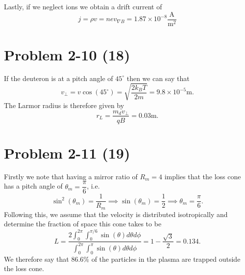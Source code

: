Lastly, if we neglect ions we obtain a drift current of
\begin{equation*}
	j = \rho v = nev_{\nabla B} = 1.87 \times 10^{-8} \dfrac{\text{A}}{\text{m}^2}
\end{equation*}


\section*{Problem 2-10 (18)}
\label{sec:2-10}
If the deuteron is at a pitch angle of \(45^\circ \) then we can say that
\begin{equation*}
	v_\perp = v\cos(45^\circ) = \sqrt{\dfrac{2k_BT}{2m}} = 9.8 \times 10^{-5}\text{m}.
\end{equation*}
The Larmor radius is therefore given by
\begin{equation*}
	r_L = \dfrac{m_d v_\perp}{qB} = 0.03\text{m}.
\end{equation*}

\section*{Problem 2-11 (19)}
\label{sec:2-11}
Firstly we note that having a mirror ratio of \(R_m = 4\) implies that the loss cone has a pitch angle of \(\theta_m = \dfrac{\pi}{6} \), i.e.
\begin{equation*}
	\sin^2(\theta_m) = \dfrac{1}{R_m} \implies \sin(\theta_m) = \dfrac{1}{2} \implies \theta_m = \dfrac{\pi}{6}.
\end{equation*}
Following this, we assume that the velocity is distributed isotropically and determine the fraction of space this cone takes to be
\begin{equation*}
	L = \dfrac{2\int_0^{2\pi}\int_0^{\pi/6}\sin(\theta)d\theta d\phi}{\int_0^{2\pi}\int_0^{\pi}\sin(\theta)d\theta d\phi} = 1-\dfrac{\sqrt{3}}{2} = 0.134.
\end{equation*}
We therefore say that \(86.6\% \) of the particles in the plasma are trapped outside the loss cone.

%

